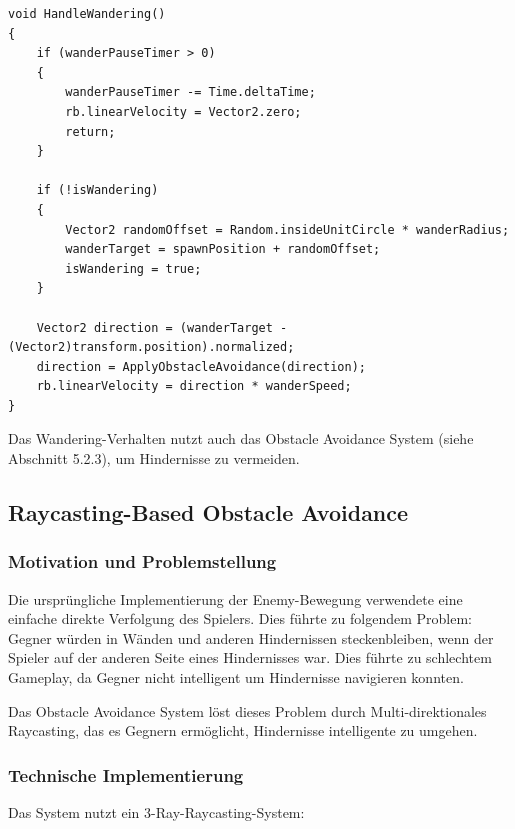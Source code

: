 \documentclass[
  a4paper,
  11pt,
  ngerman,
  parskip=half,
  bibliography=totoc,
  listof=totoc
]{scrreprt}
\begin{document}
\begin{lstlisting}[caption={Wandering Behavior (Enemy\_Movement.cs)}, label=lst:wandering]
void HandleWandering()
{
    if (wanderPauseTimer > 0)
    {
        wanderPauseTimer -= Time.deltaTime;
        rb.linearVelocity = Vector2.zero;
        return;
    }

    if (!isWandering)
    {
        Vector2 randomOffset = Random.insideUnitCircle * wanderRadius;
        wanderTarget = spawnPosition + randomOffset;
        isWandering = true;
    }

    Vector2 direction = (wanderTarget - (Vector2)transform.position).normalized;
    direction = ApplyObstacleAvoidance(direction);
    rb.linearVelocity = direction * wanderSpeed;
}
\end{lstlisting}

Das Wandering-Verhalten nutzt auch das Obstacle Avoidance System (siehe Abschnitt 5.2.3), um Hindernisse zu vermeiden.

\subsection{Raycasting-Based Obstacle Avoidance}

\subsubsection{Motivation und Problemstellung}

Die ursprüngliche Implementierung der Enemy-Bewegung verwendete eine einfache direkte Verfolgung des Spielers. Dies führte zu folgendem Problem: \\Gegner würden in Wänden und anderen Hindernissen steckenbleiben, wenn der Spieler auf der anderen Seite eines Hindernisses war. Dies führte zu schlechtem Gameplay, da Gegner nicht intelligent um Hindernisse navigieren konnten.

Das Obstacle Avoidance System löst dieses Problem durch Multi-direktionales Raycasting, das es Gegnern ermöglicht, Hindernisse intelligente zu umgehen.

\subsubsection{Technische Implementierung}

Das System nutzt ein 3-Ray-Raycasting-System:
\end{document}
